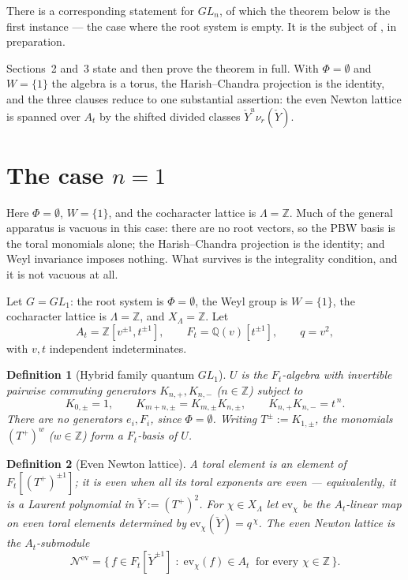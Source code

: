 \documentclass[11pt]{article}
\newtheorem{definition}{Definition}
\newcommand{\At}{A_t}
\newcommand{\Ft}{F_t}
\newcommand{\Nev}{\mathcal N^{\mathrm{ev}}}
\newcommand{\Yc}{\check Y}
\begin{document}
\medskip\noindent
There is a corresponding statement for $GL_n$, of which the theorem below is the first instance ---
the case where the root system is empty. It is the subject of \cite{HauselLowit}, in preparation.

\medskip\noindent
Sections~2 and~3 state and then prove the theorem in full. With $\Phi=\emptyset$ and
$W=\{1\}$ the algebra is a torus, the Harish--Chandra projection is the identity, and the three
clauses reduce to one substantial assertion: the even Newton lattice is spanned over $\At$ by the
shifted divided classes $\Yc^{u}\nu_r(\Yc)$.



\section{The case $n=1$}

\noindent
Here $\Phi=\emptyset$, $W=\{1\}$, and the cocharacter lattice is $\Lambda=\mathbb Z$. Much of the
general apparatus is vacuous in this case: there are no root vectors, so the PBW basis is the toral
monomials alone; the Harish--Chandra projection is the identity; and Weyl invariance imposes
nothing. What survives is the integrality condition, and it is not vacuous at all.

Let $G=GL_1$: the root system is $\Phi=\emptyset$, the Weyl group is
$W=\{1\}$, the cocharacter lattice is $\Lambda=\mathbb Z$, and
$X_\Lambda=\mathbb Z$. Let
\[
  \At=\mathbb Z[v^{\pm1},t^{\pm1}],\qquad
  \Ft=\mathbb Q(v)[t^{\pm1}],\qquad
  q=v^{2},
\]
with $v,t$ independent indeterminates.

\begin{definition}[Hybrid family quantum $GL_1$]\label{def:U}
$U$ is the $\Ft$-algebra with invertible pairwise commuting generators
$K_{n,+},K_{n,-}$ ($n\in\mathbb Z$) subject to
\[
  K_{0,\pm}=1,\qquad
  K_{m+n,\pm}=K_{m,\pm}K_{n,\pm},\qquad
  K_{n,+}K_{n,-}=t^{\,n}.
\]
There are no generators $e_i,F_i$, since $\Phi=\emptyset$. Writing
$T^{\pm}:=K_{1,\pm}$, the monomials $(T^{+})^{w}$ ($w\in\mathbb Z$) form a
$\Ft$-basis of $U$.
\end{definition}

\begin{definition}[Even Newton lattice]\label{def:nev}
A \emph{toral} element is an element of $\Ft[(T^{+})^{\pm1}]$; it is \emph{even}
when all its toral exponents are even --- equivalently, it is a Laurent
polynomial in $\Yc:=(T^{+})^{2}$. For $\chi\in X_\Lambda$ let
$\mathrm{ev}_\chi$ be the $\At$-linear map on even toral elements determined by
$\mathrm{ev}_\chi(\Yc)=q^{\,\chi}$. The \emph{even Newton lattice} is the
$\At$-submodule
\[
  \Nev=\bigl\{\,f\in\Ft[\Yc^{\pm1}]\;:\;
  \mathrm{ev}_\chi(f)\in\At\ \text{ for every }\chi\in\mathbb Z\,\bigr\}.
\]
\end{definition}
\end{document}
